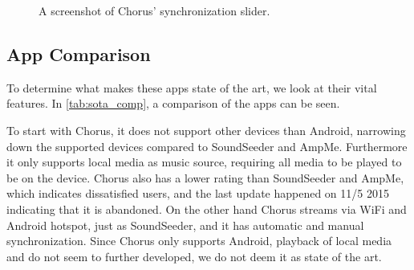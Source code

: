 \begin{figure}[h!]
\begin{minipage}[b]{0.45\textwidth}
        \caption{A screenshot of Chorus' synchronization slider.}\label{fig:chorus_slider}
    \end{minipage}
\end{figure}

\subsection{App Comparison}\label{ssec:app_comparison}
To determine what makes these apps state of the art,
we look at their vital features.
In \cref{tab:sota_comp}, a comparison of the apps can be seen. 

To start with Chorus, it does not support other devices than Android, narrowing down the supported devices compared to SoundSeeder and AmpMe.
Furthermore it only supports local media as music source, requiring all media to be played to be on the device. 
Chorus also has a lower rating than SoundSeeder and AmpMe, which indicates dissatisfied users,
and the last update happened on 11/5 2015 indicating that it is abandoned. 
On the other hand Chorus streams via WiFi and Android hotspot, just as SoundSeeder, and it has automatic and manual synchronization.
Since Chorus only supports Android, playback of local media and do not seem to further developed,
we do not deem it as state of the art.

